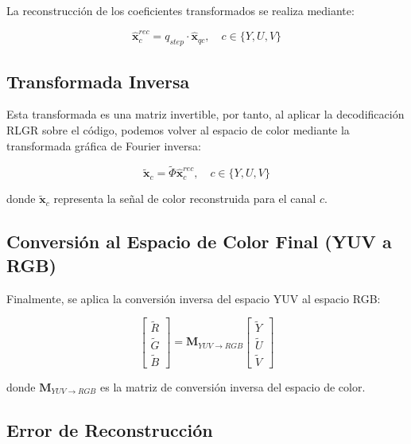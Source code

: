   La reconstrucción de los coeficientes transformados se realiza mediante:
   
   \begin{equation}
       \hat{\mathbf{x}}_{c}^{rec} = q_{step} \cdot \hat{\mathbf{x}}_{qc}, \quad c \in \{Y,U,V\}
   \end{equation}
   
   \subsection{Transformada Inversa}
   
   Esta transformada es una matriz invertible, por tanto, al aplicar la decodificación RLGR sobre el código, podemos volver al espacio de color mediante la transformada gráfica de Fourier inversa:
   
   \begin{equation}
       \tilde{\mathbf{x}}_c = \tilde{\Phi} \hat{\mathbf{x}}_{c}^{rec}, \quad c \in \{Y,U,V\}
   \end{equation}
   
   donde $\tilde{\mathbf{x}}_c$ representa la señal de color reconstruida para el canal $c$.
   
   \subsection{Conversión al Espacio de Color Final (YUV a RGB)}
   
   Finalmente, se aplica la conversión inversa del espacio YUV al espacio RGB:
   
   \begin{equation}
       \begin{bmatrix} \tilde{R} \\ \tilde{G} \\ \tilde{B} \end{bmatrix} = \mathbf{M}_{YUV \to RGB} \begin{bmatrix} \tilde{Y} \\ \tilde{U} \\ \tilde{V} \end{bmatrix}
   \end{equation}
   
   donde $\mathbf{M}_{YUV \to RGB}$ es la matriz de conversión inversa del espacio de color.
   
   \subsection{Error de Reconstrucción} \label{sec:metrics_method}
   
